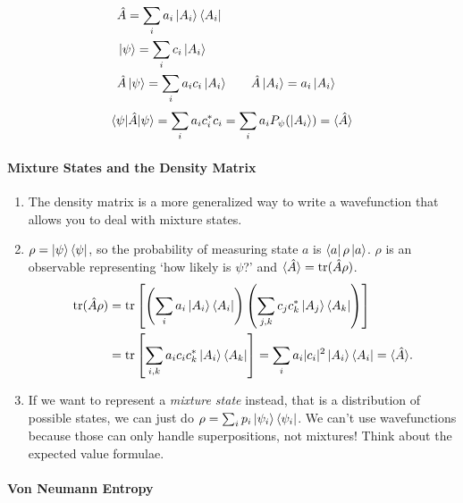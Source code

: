 \documentclass[12pt]{article}
\theoremstyle{remark}
\begin{document}
        \begin{align*}
        &\hat A = \sum_i a_i \ket{A_i}\bra{A_i}\\
        &\ket{\psi} = \sum_i c_i \ket{A_i} \\
        &\hat A \ket{\psi} = \sum_i a_i c_i \ket{A_i} &&\quad \hat A \ket{A_i} = a_i\ket{A_i}
    \end{align*}
        \[
        \braket{\psi|\hat A| \psi} = \sum_i a_i c_i^\ast c_i = \sum_i a_i P_\psi(\ket{A_i})=\langle\hat A\rangle 
        \]



\paragraph{Mixture States and the Density Matrix}
    \begin{enumerate}
        \item The density matrix is a more generalized way to write a wavefunction that allows you to deal with mixture states.

        \item $\rho = \ket{\psi}\bra{\psi}$, so the probability of measuring state $a$ is $\bra{a}\rho\ket{a}$. $\rho$ is an observable representing `how likely is $\psi$?' and $\braket{\hat A} = \mathrm{tr}(\hat A \rho)$.
        \begin{align*}\mathrm{tr}(\hat A \rho) &= \mathrm{tr}\left[\left(\sum_i a_i \ket{A_i} \bra{A_i}\right)\left(\sum_{j,k} c_j c_k^\ast \ket{A_j}\bra{A_k}\right)\right] \\
        &= \mathrm{tr}\left[\sum_{i,k}a_i c_i c_k^\ast \ket{A_i}\bra{A_k}\right]=\sum_ia_i|c_i|^2\ket{A_i}\bra{A_i}=\langle\hat A\rangle.
        \end{align*}

        \item If we want to represent a \emph{mixture state} instead, that is a distribution of possible states, we can just do $\rho = \sum_i p_i \ket{\psi_i}\bra{\psi_i}$. We can't use wavefunctions because those can only handle superpositions, not mixtures! Think about the expected value formulae.
    \end{enumerate}


\paragraph{Von Neumann Entropy}
    
\end{document}
